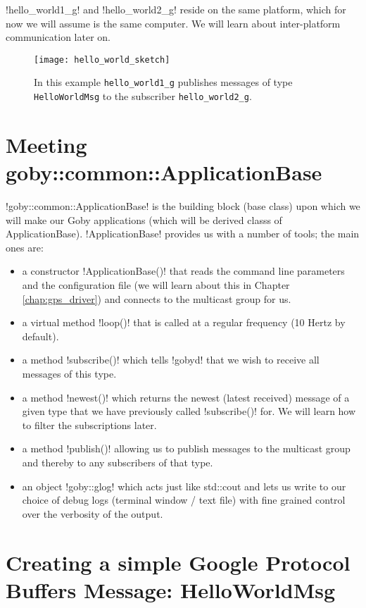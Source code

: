 !hello_world1_g! and !hello_world2_g! reside on the same \gls{platform}, which for now we will assume is the same computer. We will learn about inter-platform communication later on.

\begin{figure}
\centering
\texttt{[image: hello\_world\_sketch]}
\caption{In this example \texttt{hello\_world1\_g} publishes messages of type \texttt{HelloWorldMsg} to the subscriber \texttt{hello\_world2\_g}.}
\label{fig:hello_world_sketch}
\end{figure}

\section{Meeting goby::common::ApplicationBase}

!goby::common::ApplicationBase! is the building block (\gls{base class}) upon which we will make our Goby applications (which will be \glspl{derived class} of ApplicationBase). !ApplicationBase! provides us with a number of tools; the main ones are:

\begin{itemize}
\item a constructor !ApplicationBase()! that reads the command line parameters and the configuration file (we will learn about this in Chapter \ref{chap:gps_driver}) and connects to the \gls{multicast} group for us.
\item a virtual method !loop()! that is called at a regular frequency (10 Hertz by default).
\item a method !subscribe()! which tells !gobyd! that we wish to receive all messages of this type.
\item a method !newest()! which returns the newest (latest received) message of a given type that we have previously called !subscribe()! for. We will learn how to filter the subscriptions later.
\item a method !publish()! allowing us to publish messages to the multicast group and thereby to any subscribers of that type.
\item an object !goby::glog! which acts just like std::cout and lets us write to our choice of debug logs (terminal window / text file) with fine grained control over the verbosity of the output.
\end{itemize}

\section{Creating a simple Google Protocol Buffers Message: HelloWorldMsg}\label{sec:proto_ex}

